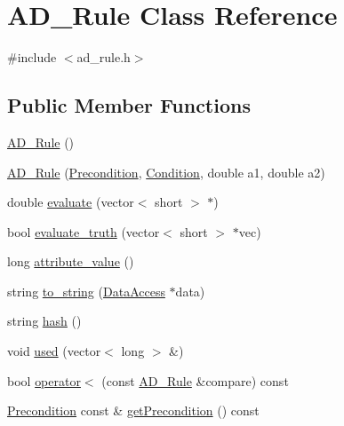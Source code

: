 \hypertarget{classAD__Rule}{
\section{AD\_\-Rule Class Reference}
\label{classAD__Rule}
}


{\ttfamily \#include $<$ad\_\-rule.h$>$}

\subsection*{Public Member Functions}
\begin{DoxyCompactItemize}
\item 
\hyperlink{classAD__Rule_a78595924816b520614bdc59afd34c61e}{AD\_\-Rule} ()
\item 
\hyperlink{classAD__Rule_abec668f1da4b1893dbf335e9b542d666}{AD\_\-Rule} (\hyperlink{classPrecondition}{Precondition}, \hyperlink{classCondition}{Condition}, double a1, double a2)
\item 
double \hyperlink{classAD__Rule_ab6f961c488d71dd882b3341b3b07c379}{evaluate} (vector$<$ short $>$ $\ast$)
\item 
bool \hyperlink{classAD__Rule_aaa7a8e038626e611ebc8176b92d6b95b}{evaluate\_\-truth} (vector$<$ short $>$ $\ast$vec)
\item 
long \hyperlink{classAD__Rule_ad0b4a6286800e1d8f6e7ac10be8dd691}{attribute\_\-value} ()
\item 
string \hyperlink{classAD__Rule_a6f89690e779ccd53468fed8f04e4bf63}{to\_\-string} (\hyperlink{classDataAccess}{DataAccess} $\ast$data)
\item 
string \hyperlink{classAD__Rule_a8edfd345e2273fbb087dd51f4a0222d3}{hash} ()
\item 
void \hyperlink{classAD__Rule_ab4adf87b03be96137ff952d70a0045fd}{used} (vector$<$ long $>$ \&)
\item 
bool \hyperlink{classAD__Rule_afe7504476cbb28eba8c5473633082de2}{operator$<$} (const \hyperlink{classAD__Rule}{AD\_\-Rule} \&compare) const 
\item 
\hyperlink{classPrecondition}{Precondition} const \& \hyperlink{classAD__Rule_a60ab01b6d2aec0a056e5944b95fb90c1}{getPrecondition} () const 
\end{DoxyCompactItemize}


